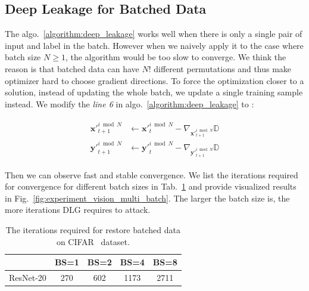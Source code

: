 % 

\subsection{Deep Leakage for Batched Data}\label{sec:algorithm:batched}



The algo.~\ref{algorithm:deep_leakage} works well when there is only a single pair of input and label in the batch. However when we naively apply it to the case where batch size $N \ge 1$, the algorithm would be too slow to converge. We think the reason is that batched data can have $N!$ different permutations and thus make optimizer hard to choose gradient directions. 
% 
To force the optimization closer to a solution, instead of updating the whole batch, we update a single training sample instead. 
%
We modify the \textit{line 6} in algo.~\ref{algorithm:deep_leakage} to : 

\begin{align}
\begin{split}
    \mathbf{x'}^{i \bmod N}_{t+1} &\leftarrow \mathbf{x'}^{i \bmod N}_{t} - \nabla_{\mathbf{x'}^{i \bmod N}_{t+1}} \mathbb{D}
    \\
    \mathbf{y'}^{i \bmod N}_{t+1} &\leftarrow \mathbf{y'}^{i \bmod N}_{t} - \nabla_{\mathbf{y'}^{i \bmod N}_{t+1}} \mathbb{D}
\end{split}
\end{align}

Then we can observe fast and stable convergence. We list the iterations required for convergence for different batch sizes in Tab.~\ref{tab:batched_restore} and provide visualized results in Fig.~\ref{fig:experiment_vision_multi_batch}. The larger the batch size is, the more iterations DLG requires to attack. 

\begin{table}[h]
    \centering
    \begin{tabular}{c|c|c|c|c}
                  & BS=1 & BS=2 & BS=4 & BS=8 \\ \hline
        ResNet-20 & 270 & 602 & 1173 & 2711 
    \end{tabular}
    \caption{The iterations required for restore batched data on CIFAR~\cite{krizhevsky2009cifar} dataset. 
    }
    \label{tab:batched_restore}
\end{table}

\pagebreak
